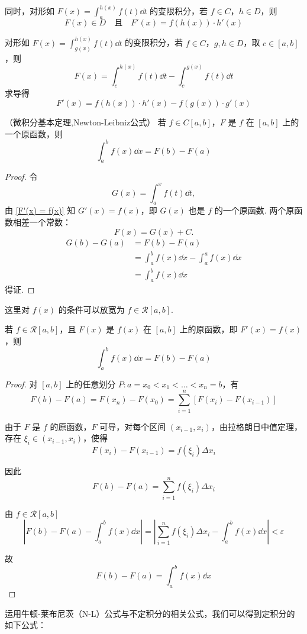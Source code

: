 同时，对形如 \( F(x) = \displaystyle\int_a^{h(x)} f(t)\dd t \) 的变限积分，若 \( f \in C \)，\( h \in D \)，则
\[
F(x) \in D \quad \text{且} \quad F'(x) = f(h(x)) \cdot h'(x)
\]

对形如 \( F(x) =\displaystyle \int_{g(x)}^{h(x)} f(t)\dd t \) 的变限积分，若 \( f \in C \)，\( g,h \in D \)，取 \( c \in [a,b] \)，则
\[
F(x) = \int_c^{h(x)} f(t)\dd t - \int_c^{g(x)} f(t)\dd t
\]
求导得
\[
F'(x) = f(h(x)) \cdot h'(x) - f(g(x)) \cdot g'(x)
\]
\begin{theorem}（微积分基本定理,Newton-Leibniz公式）
	若 $f \in C[a,b]$，$F$ 是 $f$ 在 $[a,b]$ 上的一个原函数，则
	\[
	\int_a^b f(x)\dd x = F(b) - F(a)
	\]
\end{theorem}
\begin{proof}
	令
	\[
	G(x) = \int_a^x f(t)\dd t,
	\]
	由 \ref{F'(x) = f(x)} 知 $G'(x) = f(x)$，即 $G(x)$ 也是 $f$ 的一个原函数.
	两个原函数相差一个常数：
	\[
	F(x)= G(x)  + C.
	\]
	\[
	\begin{aligned}
		G(b) - G(a) &= F(b) - F(a) \\
		&= \int_a^b f(x)\dd x - \int_a^a f(x)\dd x \\
		&= \int_a^b f(x)\dd x
	\end{aligned}
	\]
	得证.
\end{proof}
这里对 $f(x)$ 的条件可以放宽为 $f \in \mathcal{R}[a,b]$.
\begin{proposition}
	若 $f \in \mathcal{R}[a,b]$，且 $F(x)$ 是 $f(x)$ 在 $[a,b]$ 上的原函数，即 $F'(x) = f(x)$，则
	\[
	\int_a^b f(x) \dd x = F(b) - F(a)
	\]
\end{proposition}
\begin{proof}
	对 $[a,b]$ 上的任意划分 $P: a = x_0 < x_1 < \dots < x_n = b$，有
	\[
	F(b) - F(a) = F(x_n) - F(x_0) = \sum_{i=1}^n \left[ F(x_i) - F(x_{i-1}) \right]
	\]
	
	由于 $F$ 是 $f$ 的原函数，$F$ 可导，对每个区间 $(x_{i-1},x_i)$，由拉格朗日中值定理，存在 $\xi_i \in (x_{i-1},x_i)$，使得
	\[
	F(x_i) - F(x_{i-1}) = f(\xi_i) \Delta x_i
	\]
	
	因此
	\[
	F(b) - F(a) = \sum_{i=1}^n f(\xi_i) \Delta x_i
	\]
	
	由 $f \in \mathcal{R}[a,b]$
	\[
	\left| F(b) - F(a) - \int_a^b f(x)\dd x \right| = \left| \sum_{i=1}^n f(\xi_i) \Delta x_i - \int_a^b f(x)\dd x \right| < \varepsilon
	\]
	
	故
	\[
	F(b) - F(a) = \int_a^b f(x)\dd x
	\]
	
\end{proof}

运用牛顿-莱布尼茨（N-L）公式与不定积分的相关公式，我们可以得到定积分的如下公式：

